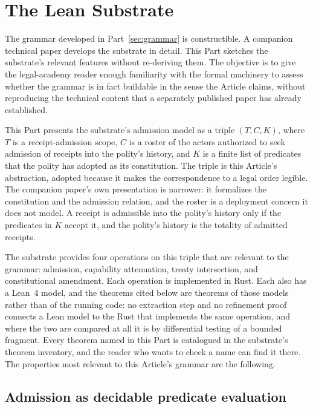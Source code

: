 \section{The Lean Substrate}
\label{sec:substrate}

The grammar developed in Part~\ref{sec:grammar} is constructible.
A companion technical paper \cite{ref_chio_parent_paper} develops the substrate in detail.
This Part sketches the substrate's relevant features without re-deriving them.
The objective is to give the legal-academy reader enough familiarity with the formal machinery to assess
whether the grammar is in fact buildable in the sense the Article claims,
without reproducing the technical content that a separately published paper has already established.

This Part presents the substrate's admission model as a triple
$(T, C, K)$,
where $T$ is a receipt-admission scope, $C$ is a roster of the actors authorized to seek
admission of receipts into the polity's history, and $K$ is a finite list of predicates that the polity has
adopted as its constitution.
The triple is this Article's abstraction, adopted because it makes the correspondence to a legal order legible.
The companion paper's own presentation is narrower: it formalizes the constitution and the admission relation,
and the roster is a deployment concern it does not model.
A receipt is admissible into the polity's history only if the predicates in $K$ accept it,
and the polity's history is the totality of admitted receipts.

The substrate provides four operations on this triple that are relevant to the grammar:
admission, capability attenuation, treaty intersection, and constitutional amendment.
Each operation is implemented in Rust.
Each also has a Lean~4 model, and the theorems cited below are theorems of those models rather than of the
running code: no extraction step and no refinement proof connects a Lean model to the Rust that implements the
same operation, and where the two are compared at all it is by differential testing of a bounded fragment.
Every theorem named in this Part is catalogued in the substrate's theorem inventory, and the reader who wants to
check a name can find it there.
The properties most relevant to this Article's grammar are the following.

\subsection{Admission as decidable predicate evaluation}

